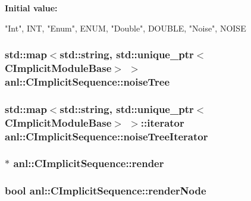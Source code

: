 \label{classanl_1_1CImplicitSequence_a387855cd1e251196f98a3c683ebfa66f}
{\bfseries Initial value:}
\begin{DoxyCode}
 {
        {"Int", INT},
        {"Enum", ENUM},
        {"Double", DOUBLE},
        {"Noise", NOISE}
    }
\end{DoxyCode}
\hypertarget{classanl_1_1CImplicitSequence_acf719dd63bce5b8ca4a5b1c3fb477744}{
\subsubsection[{noiseTree}]{\setlength{\rightskip}{0pt plus 5cm}std::map$<$std::string, std::unique\_\-ptr$<${\bf CImplicitModuleBase}$>$ $>$ {\bf anl::CImplicitSequence::noiseTree}}}
\label{classanl_1_1CImplicitSequence_acf719dd63bce5b8ca4a5b1c3fb477744}
\hypertarget{classanl_1_1CImplicitSequence_a81841ff0a0a6ca069cd931e2f500dc92}{
\subsubsection[{noiseTreeIterator}]{\setlength{\rightskip}{0pt plus 5cm}std::map$<$std::string, std::unique\_\-ptr$<${\bf CImplicitModuleBase}$>$ $>$::iterator {\bf anl::CImplicitSequence::noiseTreeIterator}}}
\label{classanl_1_1CImplicitSequence_a81841ff0a0a6ca069cd931e2f500dc92}
\hypertarget{classanl_1_1CImplicitSequence_aaa95687c46e84298674162e46511483e}{
\subsubsection[{render}]{$\ast$ {\bf anl::CImplicitSequence::render}}}
\label{classanl_1_1CImplicitSequence_aaa95687c46e84298674162e46511483e}
\hypertarget{classanl_1_1CImplicitSequence_a58b84597820e57aefbc9f0ad5405136e}{
\subsubsection[{renderNode}]{\setlength{\rightskip}{0pt plus 5cm}bool {\bf anl::CImplicitSequence::renderNode}}}
